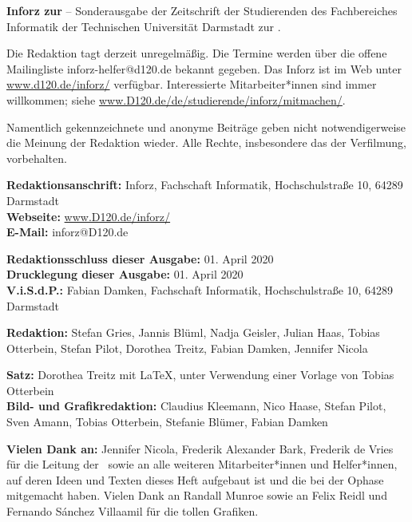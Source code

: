 \small

\textbf{Inforz zur \ophase} – Sonderausgabe der Zeitschrift der Studierenden des Fachbereiches Informatik der Technischen Universität Darmstadt zur \ophase.

\vspace{3mm}
Die Redaktion tagt derzeit unregelmäßig. Die Termine werden über die offene Mailingliste inforz-helfer@d120.de bekannt gegeben. Das Inforz ist im Web unter \url{www.d120.de/inforz/} verfügbar. Interessierte Mitarbeiter*innen sind immer willkommen; siehe \url{www.D120.de/de/studierende/inforz/mitmachen/}.

\vspace{3mm}
Namentlich gekennzeichnete und anonyme Beiträge geben nicht notwendigerweise die Meinung der Redaktion wieder. Alle Rechte, insbesondere das der Verfilmung, vorbehalten.


\textbf{Redaktionsanschrift:} Inforz, Fachschaft Informatik, Hochschulstraße 10, 64289 Darmstadt\\
\textbf{Webseite:} \url{www.D120.de/inforz/}\\
\textbf{E-Mail:} inforz@D120.de

\vspace{3mm}
\textbf{Redaktionsschluss dieser Ausgabe:} 01. April 2020\\
\textbf{Drucklegung dieser Ausgabe:} 01. April 2020\\
\textbf{V.i.S.d.P.:} Fabian Damken, Fachschaft Informatik, Hochschulstraße 10, 64289 Darmstadt

\vspace{3mm}
\textbf{Redaktion:} Stefan Gries, Jannis Blüml, Nadja Geisler, Julian Haas, Tobias Otterbein, Stefan Pilot, Dorothea Treitz, Fabian Damken, Jennifer Nicola

\vspace{3mm}
\textbf{Satz:} Dorothea Treitz mit \LaTeX, unter Verwendung einer Vorlage von Tobias Otterbein\\
\textbf{Bild- und Grafikredaktion:} Claudius Kleemann, Nico Haase, Stefan Pilot, Sven Amann, Tobias Otterbein, Stefanie Blümer, Fabian Damken

\vspace{3mm}
\textbf{Vielen Dank an:} Jennifer Nicola, Frederik Alexander Bark, Frederik de Vries für die Leitung der \ophase \  sowie an alle weiteren Mitarbeiter*innen und Helfer*innen, auf deren Ideen und Texten dieses Heft aufgebaut ist und die bei der Ophase mitgemacht haben. Vielen Dank an Randall Munroe sowie an Felix Reidl und Fernando Sánchez Villaamil für die tollen Grafiken.\\

